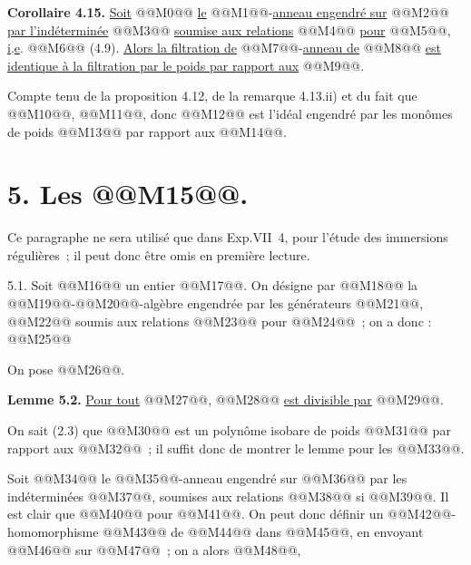 
\textbf{Corollaire 4.15.} \uline{Soit} @@M0@@ \uline{le} @@M1@@-\uline{anneau engendré sur} @@M2@@ \uline{par l'indéterminée} @@M3@@ \uline{soumise aux relations} @@M4@@ \uline{pour} @@M5@@, \uline{i}.\uline{e}. @@M6@@ (4.9). \uline{Alors la filtration de} @@M7@@-\uline{anneau de} @@M8@@ \uline{est identique à la filtration par le poids par rapport aux} @@M9@@.

Compte tenu de la proposition 4.12, de la remarque 4.13.ii) et du fait que @@M10@@, @@M11@@, donc @@M12@@ est l'idéal engendré par les monômes de poids @@M13@@ par rapport aux @@M14@@.

\section*{5. Les @@M15@@.}

Ce paragraphe ne sera utilisé que dans Exp.VII~4, pour l'étude des immersions régulières~; il peut donc être omis en première lecture.

5.1. Soit @@M16@@ un entier @@M17@@. On désigne par @@M18@@ la @@M19@@-@@M20@@-algèbre engendrée par les générateurs @@M21@@, @@M22@@ soumis aux relations @@M23@@ pour @@M24@@~; on a donc :
@@M25@@

On pose @@M26@@.

\textbf{Lemme 5.2.} \uline{Pour tout} @@M27@@, @@M28@@ \uline{est divisible par} @@M29@@.

On sait (2.3) que @@M30@@ est un polynôme isobare de poids @@M31@@ par rapport aux @@M32@@~; il suffit donc de montrer le lemme pour les @@M33@@.

Soit @@M34@@ le @@M35@@-anneau engendré sur @@M36@@ par les indéterminées @@M37@@, soumises aux relations @@M38@@ si @@M39@@. Il est clair que @@M40@@ pour @@M41@@. On peut donc définir un @@M42@@-homomorphisme @@M43@@ de @@M44@@ dans @@M45@@, en envoyant @@M46@@ sur @@M47@@~; on a alors @@M48@@,
